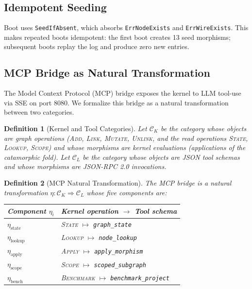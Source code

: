\documentclass[submission,copyright,creativecommons]{eptcs}
\newtheorem{definition}{Definition}
\begin{document}
\subsection{Idempotent Seeding}

Boot uses \texttt{SeedIfAbsent}, which absorbs \texttt{ErrNodeExists} and
\texttt{ErrWireExists}. This makes repeated boots idempotent: the first boot
creates 13 seed morphisms; subsequent boots replay the log and produce zero
new entries.

\subsection{MCP Bridge as Natural Transformation}
\label{subsec:mcp-bridge}

The Model Context Protocol (MCP) bridge \cite{mcp2024} exposes the kernel to
LLM tool-use via SSE on port 8080. We formalize this bridge as a natural
transformation between two categories.

\begin{definition}[Kernel and Tool Categories]
Let $\mathcal{C}_K$ be the category whose objects are graph operations
(\textup{\textsc{Add}}, \textup{\textsc{Link}}, \textup{\textsc{Mutate}}, \textup{\textsc{Unlink}}, and the
read operations \textup{\textsc{State}}, \textup{\textsc{Lookup}}, \textup{\textsc{Scope}}) and whose
morphisms are kernel evaluations (applications of the catamorphic fold). Let
$\mathcal{C}_L$ be the category whose objects are JSON tool schemas and whose
morphisms are JSON-RPC 2.0 invocations.
\end{definition}

\begin{definition}[MCP Natural Transformation]
The MCP bridge is a natural transformation $\eta\colon \mathcal{C}_K
\Rightarrow \mathcal{C}_L$ whose five components are:
\begin{center}
\begin{tabular}{@{}ll@{}}
\toprule
Component $\eta_i$ & Kernel operation $\to$ Tool schema \\
\midrule
$\eta_{\mathrm{state}}$     & \textup{\textsc{State}} $\mapsto$ \texttt{graph\_state} \\
$\eta_{\mathrm{lookup}}$    & \textup{\textsc{Lookup}} $\mapsto$ \texttt{node\_lookup} \\
$\eta_{\mathrm{apply}}$     & \textup{\textsc{Apply}} $\mapsto$ \texttt{apply\_morphism} \\
$\eta_{\mathrm{scope}}$     & \textup{\textsc{Scope}} $\mapsto$ \texttt{scoped\_subgraph} \\
$\eta_{\mathrm{bench}}$     & \textup{\textsc{Benchmark}} $\mapsto$ \texttt{benchmark\_project} \\
\bottomrule
\end{tabular}
\end{center}
\end{definition}
\end{document}
